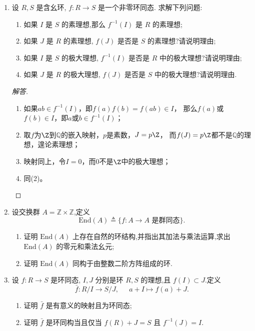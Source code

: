\begin{enumerate}
\item 设 $ R, S $ 是含幺环, $ f : R \to S $ 是一个非零环同态. 求解下列问题:
\begin{enumerate}[label=(\arabic*)]
    \item 如果 $ I $ 是 $ S $ 的素理想,那么 $ f^{-1}(I) $ 是 $ R $ 的素理想;
    \item 如果 $ J $ 是 $ R $ 的素理想, $ f(J) $ 是否是 $ S $ 的素理想?请说明理由;
    \item 如果 $ I $ 是 $ S $ 的极大理想, $ f^{-1}(I) $ 是否是 $ R $ 中的极大理想?请说明理由;
    \item 如果 $ J $ 是 $ R $ 的极大理想, $ f(J) $ 是否是 $ S $ 中的极大理想?请说明理由.
\end{enumerate}
\begin{proof}[解答]
    \begin{enumerate}[label=(\arabic*)]
    \item 如果$ab \in f^{-1}(I)$，即$f(a)f(b)=f(ab) \in I$，
    那么$f(a)$或$f(b) \in I$，即$a$或$b \in f^{-1}(I)$；
    \item 取$f$为$\Z$到$\mathbb{Q}$的嵌入映射，$p$是素数，$J=p\Z$，
    而$f(J)=p\Z$都不是$\mathbb{Q}$的理想，遑论素理想；
    \item 映射同上，令$I=0$，而$0$不是$\Z$中的极大理想；
    \item 同(2)。\qedhere
    \end{enumerate}
\end{proof}

\item 设交换群 $ A = \mathbb{Z} \times \mathbb{Z} $,定义
\[
\mathrm{End}(A) \triangleq \{ f : A \to A \text{ 是群同态} \}.
\]
\begin{enumerate}[label=(\arabic*)]
    \item 证明 $\mathrm{End}(A)$ 上存在自然的环结构,并指出其加法与乘法运算,求出 $\mathrm{End}(A)$ 的零元和乘法幺元;
    \item 证明 $\mathrm{End}(A)$ 同构于由整数二阶方阵组成的环.
\end{enumerate}

\item 设 $ f : R \to S $ 是环同态, $ I, J $ 分别是环 $ R, S $ 的理想,且 $ f(I) \subset J $.定义
\[
\bar{f} : R/I \to S/J,\ \quad\ a + I \mapsto f(a) + J.
\]
\begin{enumerate}[label=(\arabic*)]
    \item 证明 $\bar{f}$ 是有意义的映射且为环同态;
    \item 证明 $\bar{f}$ 是环同构当且仅当 $ f(R) + J = S $ 且 $ f^{-1}(J) = I $.
\end{enumerate}


\end{enumerate}
